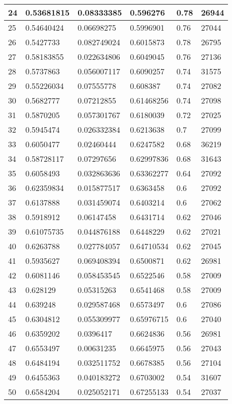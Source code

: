 \begin{longtable}{|l|l|l|l|l|l|}
24 & 0.53681815 & 0.08333385 & 0.596276 & 0.78 & 26944 \\ \hline 
25 & 0.54640424 & 0.06698275 & 0.5996901 & 0.76 & 27044 \\ \hline 
26 & 0.5427733 & 0.082749024 & 0.6015873 & 0.78 & 26795 \\ \hline 
27 & 0.58183855 & 0.022634806 & 0.6049045 & 0.76 & 27136 \\ \hline 
28 & 0.5737863 & 0.056007117 & 0.6090257 & 0.74 & 31575 \\ \hline 
29 & 0.55226034 & 0.07555778 & 0.608387 & 0.74 & 27082 \\ \hline 
30 & 0.5682777 & 0.07212855 & 0.61468256 & 0.74 & 27098 \\ \hline 
31 & 0.5870205 & 0.057301767 & 0.6180039 & 0.72 & 27025 \\ \hline 
32 & 0.5945474 & 0.026332384 & 0.6213638 & 0.7 & 27099 \\ \hline 
33 & 0.6050477 & 0.02460444 & 0.6247582 & 0.68 & 36219 \\ \hline 
34 & 0.58728117 & 0.07297656 & 0.62997836 & 0.68 & 31643 \\ \hline 
35 & 0.6058493 & 0.032863636 & 0.63362277 & 0.64 & 27092 \\ \hline 
36 & 0.62359834 & 0.015877517 & 0.6363458 & 0.6 & 27092 \\ \hline 
37 & 0.6137888 & 0.031459074 & 0.6403214 & 0.6 & 27062 \\ \hline 
38 & 0.5918912 & 0.06147458 & 0.6431714 & 0.62 & 27046 \\ \hline 
39 & 0.61075735 & 0.044876188 & 0.6448229 & 0.62 & 27021 \\ \hline 
40 & 0.6263788 & 0.027784057 & 0.64710534 & 0.62 & 27045 \\ \hline 
41 & 0.5935627 & 0.069408394 & 0.6500871 & 0.62 & 26981 \\ \hline 
42 & 0.6081146 & 0.058453545 & 0.6522546 & 0.58 & 27009 \\ \hline 
43 & 0.628129 & 0.05315263 & 0.6541468 & 0.58 & 27009 \\ \hline 
44 & 0.639248 & 0.029587468 & 0.6573497 & 0.6 & 27086 \\ \hline 
45 & 0.6304812 & 0.055309977 & 0.65976715 & 0.6 & 27040 \\ \hline 
46 & 0.6359202 & 0.0396417 & 0.6624836 & 0.56 & 26981 \\ \hline 
47 & 0.6553497 & 0.00631235 & 0.6645975 & 0.56 & 27043 \\ \hline 
48 & 0.6484194 & 0.032511752 & 0.6678385 & 0.56 & 27104 \\ \hline 
49 & 0.6455363 & 0.040183272 & 0.6703002 & 0.54 & 31607 \\ \hline 
50 & 0.6584204 & 0.025052171 & 0.67255133 & 0.54 & 27037 \\ \hline 
\end{longtable}